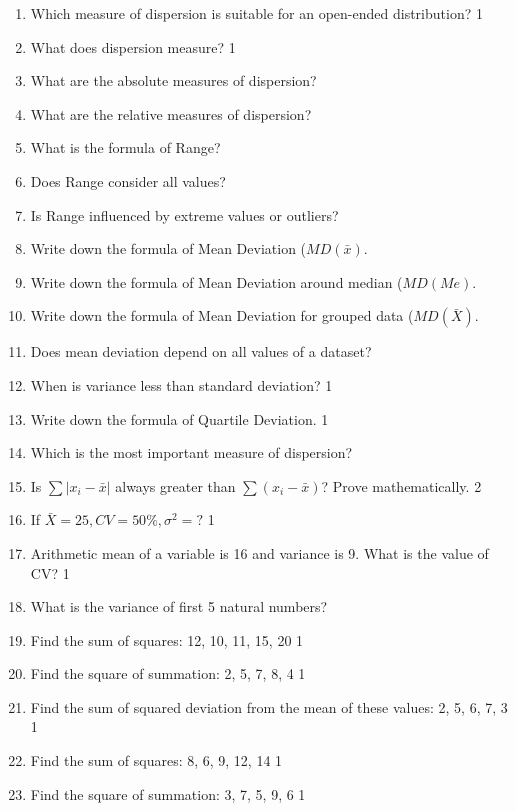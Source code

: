 \documentclass[a4paper,oneside]{book}
\begin{document}
 \begin{enumerate}
 
 \item Which measure of dispersion is suitable for an open-ended distribution?  \hfill 1
 \item What does dispersion measure?  \hfill 1
 \item What are the absolute measures of dispersion?
 \item What are the relative measures of dispersion?
 \item What is the formula of Range?
 \item Does Range consider all values?
 \item Is Range influenced by extreme values or outliers?
 \item Write down the formula of Mean Deviation ($MD(\bar x)$.
 \item Write down the formula of Mean Deviation around median ($MD(Me)$.
 \item Write down the formula of Mean Deviation for grouped data ($MD(\bar X)$.
 \item Does mean deviation depend on all values of a dataset?
  \item When is variance less than standard deviation? \hfill 1
  \item Write down the formula of Quartile Deviation. \hfill 1
 \item Which is the most important measure of dispersion?
   \item Is $\sum |x_i-\bar x|$ always greater than $\sum (x_i-\bar x)$? Prove mathematically. \hfill 2
   \item If $\bar X = 25, CV = 50\%, \sigma^2=?$ \hfill 1
   \item Arithmetic mean of a variable is 16 and variance is 9. What is the value of CV? \hfill 1
   \item What is the variance of first 5 natural numbers?
 
 \item Find the sum of squares: 12, 10, 11, 15, 20 \hfill 1
 \item Find the square of summation: 2, 5, 7, 8, 4 \hfill 1
 \item Find the sum of squared deviation from the mean of these values: 2, 5, 6, 7, 3 \hfill 1
 \item Find the sum of squares: 8, 6, 9, 12, 14 \hfill 1  

\item Find the square of summation: 3, 7, 5, 9, 6 \hfill 1  


\end{enumerate}
\end{document}
